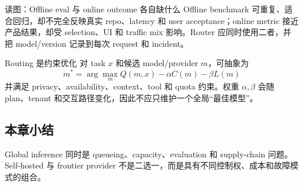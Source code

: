 \begin{knowledgebox}{读图：Offline eval 与 online outcome 各自缺什么}
Offline benchmark 可重复、适合回归，却不完全反映真实 repo、latency 和 user acceptance；online metric 接近产品结果，却受 selection、UI 和 traffic mix 影响。Router 应同时使用二者，并把 model/version 记录到每次 request 和 incident。
\end{knowledgebox}

\begin{importantbox}{Routing 是约束优化}
对 task $x$ 和候选 model/provider $m$，可抽象为
\[
m^*=\arg\max_m Q(m,x)-\alpha C(m)-\beta L(m)
\]
并满足 privacy、availability、context、tool 和 quota 约束。权重 $\alpha,\beta$ 会随 plan、tenant 和交互路径变化，因此不应只维护一个全局“最佳模型”。
\end{importantbox}


\subsection{本章小结}

Global inference 同时是 queueing、capacity、evaluation 和 supply-chain 问题。Self-hosted 与 frontier provider 不是二选一，而是具有不同控制权、成本和故障模式的组合。

